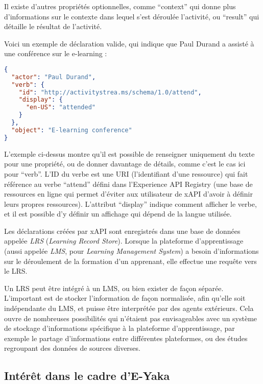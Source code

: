             \let\myitem\relax

            Il existe d’autres propriétés optionnelles, comme \enquote{context} qui donne plus d’informations sur le contexte dans lequel s’est déroulée l’activité, ou \enquote{result} qui détaille le résultat de l’activité.

            Voici un exemple de déclaration valide, qui indique que Paul Durand a assisté à une conférence sur le e-learning :

\begin{lstlisting}[language=json, numbers=none]
{
  "actor": "Paul Durand",
  "verb": {
    "id": "http://activitystrea.ms/schema/1.0/attend",
    "display": { 
      "en-US": "attended" 
    }
  },
  "object": "E-learning conference"
}
\end{lstlisting}

            L’exemple ci-dessus montre qu’il est possible de renseigner uniquement du texte pour une propriété, ou de donner davantage de détails, comme c’est le cas ici pour \enquote{verb}. L’ID du verbe est une URI (l’identifiant d’une ressource) qui fait référence au verbe \enquote{attend} défini dans l’Experience API Registry (une base de ressources en ligne qui permet d’éviter aux utilisateur de xAPI d’avoir à définir leurs propres ressources). L’attribut \enquote{display} indique comment afficher le verbe, et il est possible d’y définir un affichage qui dépend de la langue utilisée.

            Les déclarations créées par xAPI sont enregistrés dans une base de données appelée \emph{LRS} (\emph{Learning Record Store}). Lorsque la plateforme d’apprentissage (aussi appelée \emph{LMS}, pour \emph{Learning Management System}) a besoin d’informations sur le déroulement de la formation d’un apprenant, elle effectue une requête vers le LRS.

            Un LRS peut être intégré à un LMS, ou bien exister de façon séparée. L’important est de stocker l’information de façon normalisée, afin qu’elle soit indépendante du LMS, et puisse être interprétée par des agents extérieurs. Cela ouvre de nombreuses possibilités qui n’étaient pas envisageables avec un système de stockage d’informations spécifique à la plateforme d’apprentissage, par exemple le partage d’informations entre différentes plateformes, ou des études regroupant des données de sources diverses.

        \subsection{Intérêt dans le cadre d’E-Yaka}

